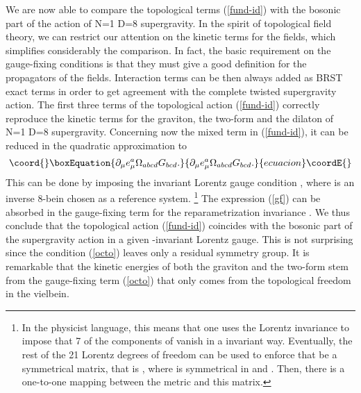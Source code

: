 \documentclass[a4paper,12pt]{article}
\begin{document}
We are now able to compare the topological terms (\ref{fund-id})
with the bosonic part of the action of N=1 D=8 supergravity.
In the spirit of topological field theory, we can restrict our attention
on the kinetic terms for the fields, which simplifies considerably
the comparison. In fact, the basic requirement 
on the gauge-fixing conditions is that they must give a good definition
for the propagators of the fields. Interaction terms can be then always
added as BRST exact terms in order to get agreement with the complete 
twisted supergravity action. 
The first three terms of the topological action (\ref{fund-id})
correctly reproduce the kinetic terms for the graviton, the two-form
and the dilaton of N=1 D=8 supergravity.
Concerning now the mixed term 
\coordHE{} in (\ref{fund-id}),
it can be reduced in the quadratic approximation 
to 
\begin{equation}\coord{}\boxEquation{
\partial _\mu e^a_\mu \Omega_{abcd} G_{bcd} .
\label{gf}
}{
\partial _\mu e^a_\mu \Omega_{abcd} G_{bcd} .
}{ecuacion}\coordE{}\end{equation}
This can be done by imposing the \coordHE{} invariant Lorentz
gauge condition
\coordHE{}, where  \coordHE{} is an inverse 
8-bein chosen as a reference system.
\footnote{In the physicist language, this means that one uses 
the Lorentz invariance to impose that 7 of the components of 
\coordHE{}  vanish in a  \coordHE{} invariant way. Eventually, the rest
of the 21 Lorentz degrees of freedom can be used to enforce that
\coordHE{} be a symmetrical
\coordHE{} matrix, that is \coordHE{}, where
\coordHE{} is symmetrical in \coordHE{} and \coordHE{}. Then, there is a
one-to-one mapping between the metric and this matrix.}
The expression (\ref{gf}) can be absorbed  in the gauge-fixing
term for the reparametrization invariance
\coordHE{}.
We thus conclude that the topological action (\ref{fund-id})
coincides with the bosonic part of the supergravity action
in a given \coordHE{}-invariant Lorentz gauge. This is not surprising
since the condition (\ref{octo}) leaves only a residual \coordHE{}
symmetry group. 
It is remarkable that the kinetic energies of both the graviton and the
two-form stem from the gauge-fixing term (\ref{octo}) that only comes from the
topological freedom in the vielbein.
\end{document}

